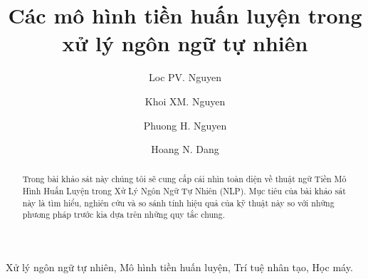 \begin{frontmatter}
\title{Các mô hình tiền huấn luyện trong xử lý ngôn ngữ tự nhiên}
\author{Loc PV. Nguyen}
\author{Khoi XM. Nguyen}
\author{Phuong H. Nguyen}
\author{Hoang N. Dang}
\address{Faculty of Information Technology, FPT University Global Education, Ho Chi Minh city, Vietnam}



\begin{abstract}
Trong bài khảo sát này chúng tôi sẽ cung cấp cái nhìn toàn diện về thuật ngữ Tiền Mô Hình Huấn Luyện trong Xử Lý Ngôn Ngữ Tự Nhiên (NLP). Mục tiêu của bài khảo sát này là tìm hiểu, nghiên cứu và so sánh tính hiệu quả của kỹ thuật này so với những phương pháp trước kia dựa trên những quy tắc chung.
\end{abstract}
\begin{keyword}
Xử lý ngôn ngữ tự nhiên, Mô hình tiền huấn luyện, Trí tuệ nhân tạo, Học máy.
\end{keyword}

\end{frontmatter}

